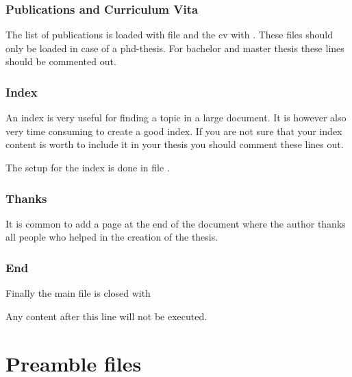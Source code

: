 \subsection{Publications and Curriculum Vita}
The list of publications is loaded with file  and the cv with . These files should only be loaded in case of a phd-thesis. For bachelor and master thesis these lines should be commented out.
%

\subsection{Index}
An index is very useful for finding a topic in a large document. It is however also very time consuming to create a good index. If you are not sure that your index content is worth to include it in your thesis you should comment these lines out.

The setup for the index is done in file .

\subsection{Thanks}
It is common to add a page at the end of the document where the author thanks all people who helped in the creation of the thesis. 

\subsection{End}
Finally the main file is closed with 

Any content after this line will not be executed.

\chapter{Preamble files}

